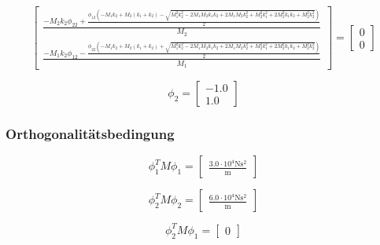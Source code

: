 \documentclass[
  letterpaper,
  DIV=11]{scrreprt}
\begin{document}
\begin{equation}\left[\begin{matrix}\frac{- M_{2} k_{2} \phi_{22} + \frac{\phi_{12} \left(- M_{1} k_{2} + M_{2} \left(k_{1} + k_{2}\right) - \sqrt{M_{1}^{2} k_{2}^{2} - 2 M_{1} M_{2} k_{1} k_{2} + 2 M_{1} M_{2} k_{2}^{2} + M_{2}^{2} k_{1}^{2} + 2 M_{2}^{2} k_{1} k_{2} + M_{2}^{2} k_{2}^{2}}\right)}{2}}{M_{2}}\\\frac{- M_{1} k_{2} \phi_{12} - \frac{\phi_{22} \left(- M_{1} k_{2} + M_{2} \left(k_{1} + k_{2}\right) + \sqrt{M_{1}^{2} k_{2}^{2} - 2 M_{1} M_{2} k_{1} k_{2} + 2 M_{1} M_{2} k_{2}^{2} + M_{2}^{2} k_{1}^{2} + 2 M_{2}^{2} k_{1} k_{2} + M_{2}^{2} k_{2}^{2}}\right)}{2}}{M_{1}}\end{matrix}\right] = \left[\begin{matrix}0\\0\end{matrix}\right]\end{equation}

\begin{equation}\phi_{2} = \left[\begin{matrix}-1.0\\1.0\end{matrix}\right]\end{equation}

\hypertarget{orthogonalituxe4tsbedingung-3}{%
\subsubsection{Orthogonalitätsbedingung}\label{orthogonalituxe4tsbedingung-3}}

\begin{equation}\phi_{1}^{T} M \phi_{1} = \left[\begin{matrix}\frac{3.0 \cdot 10^{4} \text{N} \text{s}^{2}}{\text{m}}\end{matrix}\right]\end{equation}

\begin{equation}\phi_{2}^{T} M \phi_{2} = \left[\begin{matrix}\frac{6.0 \cdot 10^{4} \text{N} \text{s}^{2}}{\text{m}}\end{matrix}\right]\end{equation}

\begin{equation}\phi_{2}^{T} M \phi_{1} = \left[\begin{matrix}0\end{matrix}\right]\end{equation}
\end{document}
